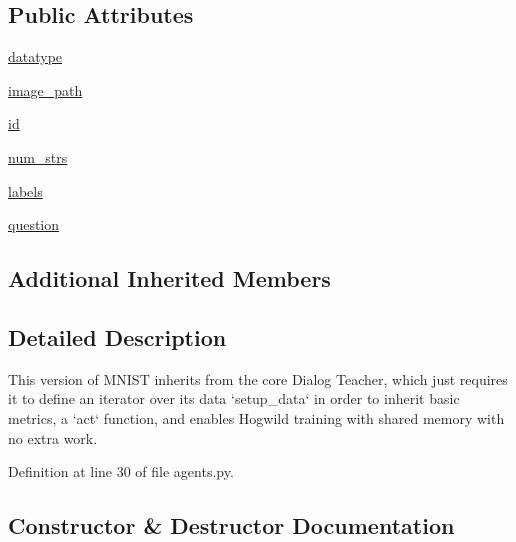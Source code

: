 \subsection*{Public Attributes}
\begin{DoxyCompactItemize}
\item 
\hyperlink{classparlai_1_1tasks_1_1mnist__qa_1_1agents_1_1MnistQATeacher_a813aa1c2a680e44e88ecb2832d99d51f}{datatype}
\item 
\hyperlink{classparlai_1_1tasks_1_1mnist__qa_1_1agents_1_1MnistQATeacher_a7c93f12d922a5f35699379983acfd5f0}{image\+\_\+path}
\item 
\hyperlink{classparlai_1_1tasks_1_1mnist__qa_1_1agents_1_1MnistQATeacher_a5f5642ab4593624e0f9a0a633deebf40}{id}
\item 
\hyperlink{classparlai_1_1tasks_1_1mnist__qa_1_1agents_1_1MnistQATeacher_aaee79511f7f1ec89e8701435e5b95036}{num\+\_\+strs}
\item 
\hyperlink{classparlai_1_1tasks_1_1mnist__qa_1_1agents_1_1MnistQATeacher_aa6621e4f56e5cdb9cb5d24bc439e2083}{labels}
\item 
\hyperlink{classparlai_1_1tasks_1_1mnist__qa_1_1agents_1_1MnistQATeacher_a79fbc5e429e1ee91b592fc6da4675c54}{question}
\end{DoxyCompactItemize}
\subsection*{Additional Inherited Members}


\subsection{Detailed Description}
\begin{DoxyVerb}This version of MNIST inherits from the core Dialog Teacher, which just requires it
to define an iterator over its data `setup_data` in order to inherit basic metrics,
a `act` function, and enables Hogwild training with shared memory with no extra
work.
\end{DoxyVerb}
 

Definition at line 30 of file agents.\+py.



\subsection{Constructor \& Destructor Documentation}
\mbox{\label{classparlai_1_1tasks_1_1mnist__qa_1_1agents_1_1MnistQATeacher_a6ef124a2cc6ff3edc13291768fafbe29}} 
